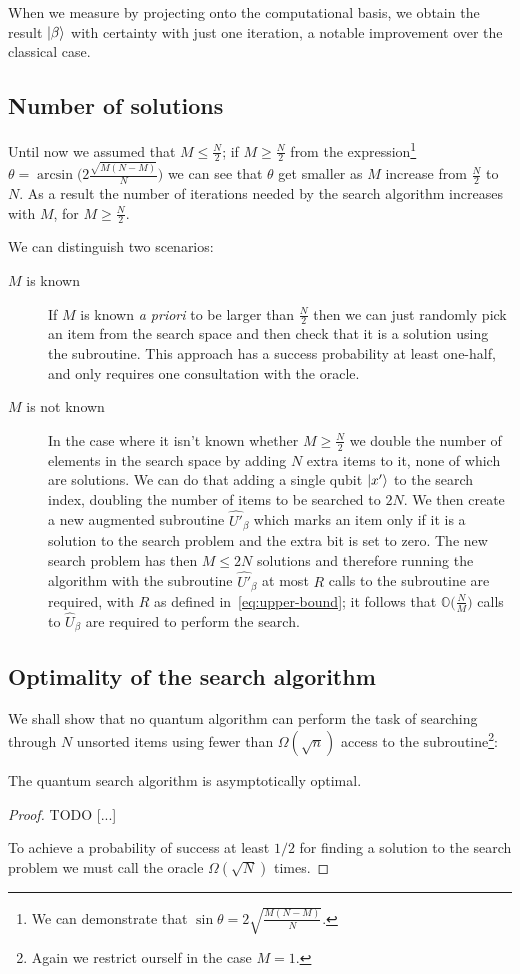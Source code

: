When we measure by projecting onto the computational basis, we obtain the result $\ket{\beta}$ with certainty with just one iteration, a notable improvement over the classical case.

\subsection{Number of solutions}\label{sec:M}
Until now we assumed that $M\leq \frac{N}{2}$; if $M \geq \frac{N}{2}$ from the expression\footnote{We can demonstrate that $\sin\theta = 2\sqrt{\frac{M(N-M)}{N}}$.} $\theta=\arcsin\biggl(2\frac{\sqrt{M(N-M)}}{N}\biggr)$ we can see that $\theta$ get smaller as $M$ increase from $\frac{N}{2}$ to $N$. As a result the number of iterations needed by the search algorithm increases with $M$, for $M\geq \frac{N}{2}$.

We can distinguish two scenarios:
\begin{description}
   \item[$M$ is known] If $M$ is known \emph{a priori} to be larger than $\frac{N}{2}$ then we can just randomly pick an item from the search space and then check that it is a solution using the subroutine. This approach has a success probability at least one-half, and only requires one consultation with the oracle.
   \item[$M$ is not known] In the case where it isn't known whether $M\geq \frac{N}{2}$ we double the number of elements in the search space by adding $N$ extra items to it, none of which are solutions. We can do that adding a single qubit $\ket{x'}$ to the search index, doubling the number of items to be searched to $2N$. We then create a new augmented subroutine $\hat{U'}_\beta$ which marks an item only if it is a solution to the search problem and the extra bit is set to zero. The new search problem has then $M \leq 2N$ solutions and therefore running the algorithm with the subroutine $\hat{U'}_\beta$ at most $R$ calls to the subroutine are required, with $R$ as defined in~\ref{eq:upper-bound}; it follows that $\mathbb{O}\bigl(\frac{N}{M}\bigr)$ calls to $\hat{U}_\beta$ are required to perform the search.
   
\end{description}
\subsection{Optimality of the search algorithm}
We shall show that no quantum algorithm can perform the task of searching through $N$ unsorted items using fewer than $\Omega(\sqrt{n})$ access to the subroutine\footnote{Again we restrict ourself in the case $M=1$.}:
\begin{theorem}
The quantum search algorithm is asymptotically optimal. 
\end{theorem}
\begin{proof}
TODO [...]

To achieve a probability of success at least $1/2$ for finding a solution to the search problem we must call the oracle $\Omega(\sqrt{N})$ times.
\end{proof}

